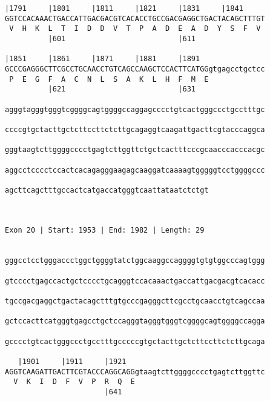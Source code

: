 \documentclass{article}
\begin{document}
\begin{Verbatim}
|1791     |1801     |1811     |1821     |1831     |1841     
GGTCCACAAACTGACCATTGACGACGTCACACCTGCCGACGAGGCTGACTACAGCTTTGT
 V  H  K  L  T  I  D  D  V  T  P  A  D  E  A  D  Y  S  F  V 
          |601                          |611                
  
|1851     |1861     |1871     |1881     |1891               
GCCCGAGGGCTTCGCCTGCAACCTGTCAGCCAAGCTCCACTTCATGGgtgagcctgctcc
 P  E  G  F  A  C  N  L  S  A  K  L  H  F  M  E             
          |621                          |631                
  
agggtagggtgggtcggggcagtggggccaggagcccctgtcactgggccctgcctttgc
                                                            
ccccgtgctacttgctcttccttctcttgcagaggtcaagattgacttcgtacccaggca
                                                            
gggtaagtcttggggcccctgagtcttggttctgctcactttcccgcaacccacccacgc
                                                            
aggcctcccctccactcacagagggaagagcaaggatcaaaagtgggggtcctggggccc
                                                            
agcttcagctttgccactcatgaccatgggtcaattataatctctgt
                                               
                                               
 
Exon 20 | Start: 1953 | End: 1982 | Length: 29


gggcctcctgggaccctggctggggtatctggcaaggccaggggtgtgtggcccagtggg
                                                            
gtcccctgagccactgctcccctgcagggtccacaaactgaccattgacgacgtcacacc
                                                            
tgccgacgaggctgactacagctttgtgcccgagggcttcgcctgcaacctgtcagccaa
                                                            
gctccacttcatgggtgagcctgctccagggtagggtgggtcggggcagtggggccagga
                                                            
gcccctgtcactgggccctgcctttgcccccgtgctacttgctcttccttctcttgcaga
                                                            
   |1901     |1911     |1921                                
AGGTCAAGATTGACTTCGTACCCAGGCAGGgtaagtcttggggcccctgagtcttggttc
  V  K  I  D  F  V  P  R  Q  E                              
                       |641                                 
  

\end{Verbatim}
\end{document}
